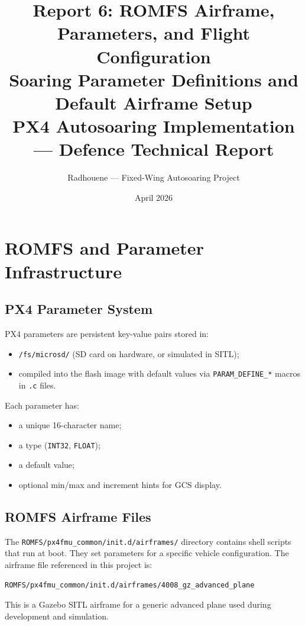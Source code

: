 \documentclass[12pt,a4paper]{article}
\title{\textbf{Report 6: ROMFS Airframe, Parameters, and Flight Configuration}\\
\large Soaring Parameter Definitions and Default Airframe Setup\\[0.5em]
\normalsize PX4 Autosoaring Implementation --- Defence Technical Report}
\author{Radhouene --- Fixed-Wing Autosoaring Project}
\date{April 2026}
\begin{document}
\maketitle
\tableofcontents
\newpage

\section{ROMFS and Parameter Infrastructure}

\subsection{PX4 Parameter System}

PX4 parameters are persistent key-value pairs stored in:
\begin{itemize}
  \item \texttt{/fs/microsd/} (SD card on hardware, or simulated in SITL);
  \item compiled into the flash image with default values via
        \texttt{PARAM\_DEFINE\_*} macros in \texttt{.c} files.
\end{itemize}

Each parameter has:
\begin{itemize}
  \item a unique 16-character name;
  \item a type (\texttt{INT32}, \texttt{FLOAT});
  \item a default value;
  \item optional min/max and increment hints for GCS display.
\end{itemize}

\subsection{ROMFS Airframe Files}

The \texttt{ROMFS/px4fmu\_common/init.d/airframes/} directory contains
shell scripts that run at boot. They set parameters for a specific vehicle
configuration. The airframe file referenced in this project is:

\begin{lstlisting}
ROMFS/px4fmu_common/init.d/airframes/4008_gz_advanced_plane
\end{lstlisting}

This is a Gazebo SITL airframe for a generic advanced plane used during
development and simulation.
\end{document}
